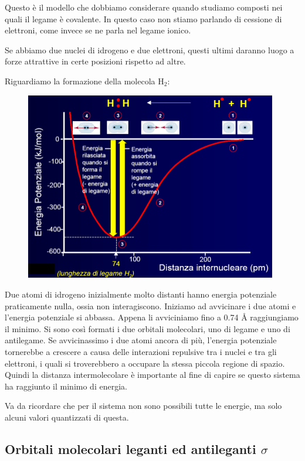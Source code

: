 Questo è il modello che dobbiamo considerare quando studiamo composti nei quali il legame è covalente. In questo caso non stiamo parlando di cessione di elettroni, come invece se ne parla nel legame ionico.

Se abbiamo due nuclei di idrogeno e due elettroni, questi ultimi daranno luogo a forze attrattive in certe posizioni rispetto ad altre.

\vspace{0.2cm}Riguardiamo la formazione della molecola H$_2$:

\begin{figure}[H]
    \centering
    \includegraphics[width=11cm]{immagini/legame_covalente_H_2.png}
\end{figure}

Due atomi di idrogeno inizialmente molto distanti hanno energia potenziale praticamente nulla, ossia non interagiscono. Iniziamo ad avvicinare i due atomi e l'energia potenziale si abbassa. Appena li avviciniamo fino a 0.74 Å raggiungiamo il minimo. Si sono così formati i due orbitali molecolari, uno di legame e uno di antilegame. Se avvicinassimo i due atomi ancora di più, l'energia potenziale tornerebbe a crescere a causa delle interazioni repulsive tra i nuclei e tra gli elettroni, i quali si troverebbero a occupare la stessa piccola regione di spazio. Quindi la distanza intermolecolare è importante al fine di capire se questo sistema ha raggiunto il minimo di energia.

Va da ricordare che per il sistema non sono possibili tutte le energie, ma solo alcuni valori quantizzati di questa.
\subsection{Orbitali molecolari leganti ed antileganti $\sigma$}

